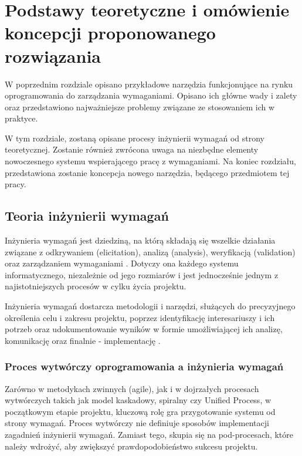 \chapter{Podstawy teoretyczne i omówienie koncepcji proponowanego rozwiązania}
  
  W poprzednim rozdziale opisano przykładowe narzędzia funkcjonujące na rynku oprogramowania do zarządzania wymaganiami. Opisano ich główne wady i zalety oraz przedstawiono najważniejsze problemy związane ze stosowaniem ich w praktyce.

  W tym rozdziale, zostaną opisane procesy inżynierii wymagań od strony teoretycznej. Zostanie również zwrócona uwaga na niezbędne elementy nowoczesnego systemu wspierającego pracę z wymaganiami. Na koniec rozdziału, przedstawiona zostanie koncepcja nowego narzędzia, będącego przedmiotem tej pracy.
  
  \section{Teoria inżynierii wymagań}
    
    Inżynieria wymagań jest dziedziną, na którą składają się wszelkie działania związane z odkrywaniem (elicitation), analizą (analysis), weryfikacją (validation) oraz zarządzaniem wymaganiami \cite{Somm06}. Dotyczy ona każdego systemu informatycznego, niezależnie od jego rozmiarów i jest jednocześnie jednym z najistotniejszych procesów w cylku życia projektu.

    Inżynieria wymagań dostarcza metodologii i narzędzi, służących do precyzyjnego określenia celu i zakresu projektu, poprzez identyfikację interesariuszy i ich potrzeb oraz udokumentowanie wyników w formie umożliwiającej ich analizę, komunikację oraz finalnie - implementację \cite{Nus00}. 

    \subsection{Proces wytwórczy oprogramowania a inżynieria wymagań}

      Zarówno w metodykach zwinnych (agile), jak i w dojrzałych procesach wytwórczych takich jak model kaskadowy, spiralny czy Unified Process, w początkowym etapie projektu, kluczową rolę gra przygotowanie systemu od strony wymagań. Proces wytwórczy nie definiuje sposobów implementacji zagadnień inżynierii wymagań. Zamiast tego, skupia się na pod-procesach, które należy wdrożyć, aby zwiększyć prawdopodobieństwo sukcesu projektu.

